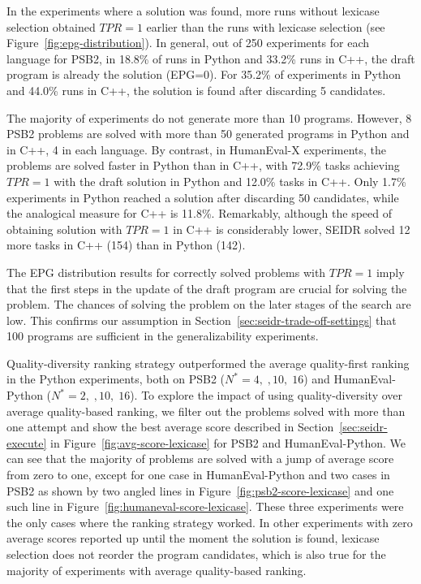 In the experiments where a solution was found, more runs without lexicase selection obtained $TPR=1$ earlier than the runs with lexicase selection (see Figure~\ref{fig:epg-distribution}).
In general, out of 250 experiments for each language for PSB2, in 18.8\% of runs in Python and 33.2\% runs in C++, the draft program is already the solution (EPG=0). 
For 35.2\% of experiments in Python and 44.0\% runs in C++, the solution is found after discarding 5 candidates. 

The majority of experiments do not generate more than 10 programs. 
However, 8 PSB2 problems are solved with more than 50 generated programs in Python and in C++, 4 in each language.
By contrast, in HumanEval-X experiments, the problems are solved faster in Python than in C++, with 72.9\% tasks achieving $TPR=1$ with the draft solution in Python and 12.0\% tasks in C++.
Only 1.7\% experiments in Python reached a solution after discarding 50 candidates, while the analogical measure for C++ is 11.8\%.
Remarkably, although the speed of obtaining solution with $TPR=1$ in C++ is considerably lower, SEIDR solved 12 more tasks in C++ (154) than in Python (142). 



The EPG distribution results for correctly solved problems with $TPR=1$ imply that the first steps in the update of the draft program are crucial for solving the problem. 
The chances of solving the problem on the later stages of the search are low.
This confirms our assumption in Section~\ref{sec:seidr-trade-off-settings} that 100 programs are sufficient in the generalizability experiments.



Quality-diversity ranking strategy outperformed the average quality-first ranking in the Python experiments, both on PSB2 ($N^*=4, \;, 10, \; 16$) and HumanEval-Python ($N^*=2, \;, 10, \; 16$). 
To explore the impact of using quality-diversity over average quality-based ranking, we filter out the problems solved with more than one attempt and show the best average score described in Section~\ref{sec:seidr-execute} in Figure~\ref{fig:avg-score-lexicase} for PSB2 and HumanEval-Python. 
We can see that the majority of problems are solved with a jump of average score from zero to one, except for one case in HumanEval-Python and two cases in PSB2 as shown by two angled lines in Figure~\ref{fig:psb2-score-lexicase} and one such line in Figure~\ref{fig:humaneval-score-lexicase}. 
These three experiments were the only cases where the ranking strategy worked. 
In other experiments with zero average scores reported up until the moment the solution is found, lexicase selection does not reorder the program candidates, which is also true for the majority of experiments with average quality-based ranking.

